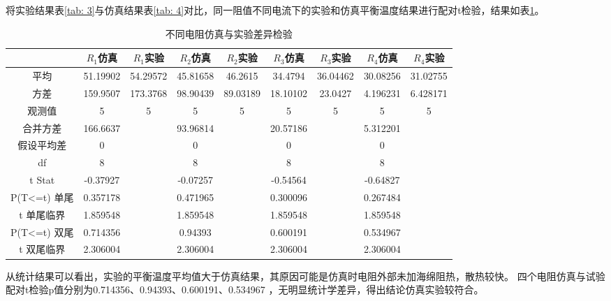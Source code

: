 \documentclass[10pt,a4paper,twoside,UTF8]{ctexart}
\begin{document}
将实验结果表\ref{tab: 3}与仿真结果表\ref{tab: 4}对比，同一阻值不同电流下的实验和仿真平衡温度结果进行配对t检验，结果如表\ref{tab: 5}。
\begin{table}[H]
	\centering
	  \begin{tabular}{ccccccccc}
		\toprule
		& $R_1$仿真 & $R_1$实验 & $R_2$仿真 & $R_2$实验 & $R_3$仿真 & $R_3$实验 & $R_4$仿真 & $R_4$实验 \\
		\midrule
		平均    & 51.19902 & 54.29572 & 45.81658 & 46.2615 & 34.4794 & 36.04462 & 30.08256 & 31.02755 \\
		方差    & 159.9507 & 173.3768 & 98.90439 & 89.03189 & 18.10102 & 23.0427 & 4.196231 & 6.428171 \\
		观测值   & 5     & 5     & 5     & 5     & 5     & 5     & 5     & 5 \\
		合并方差  & 166.6637 &       & 93.96814 &       & 20.57186 &       & 5.312201 &  \\
		假设平均差 & 0     &       & 0     &       & 0     &       & 0     &  \\
		df    & 8     &       & 8     &       & 8     &       & 8     &  \\
		t Stat & -0.37927 &       & -0.07257 &       & -0.54564 &       & -0.64827 &  \\
		P(T<=t) 单尾 & 0.357178 &       & 0.471965 &       & 0.300096 &       & 0.267484 &  \\
		t 单尾临界 & 1.859548 &       & 1.859548 &       & 1.859548 &       & 1.859548 &  \\
		P(T<=t) 双尾 & 0.714356 &       & 0.94393 &       & 0.600191 &       & 0.534967 &  \\
		t 双尾临界 & 2.306004 &       & 2.306004 &       & 2.306004 &       & 2.306004 &  \\
		\bottomrule	\end{tabular}
	\caption{不同电阻仿真与实验差异检验}	  
	\label{tab: 5}
  \end{table}

  从统计结果可以看出，实验的平衡温度平均值大于仿真结果，其原因可能是仿真时电阻外部未加海绵阻热，散热较快。
  四个电阻仿真与试验配对t检验p值分别为0.714356、0.94393、0.600191、0.534967 ，无明显统计学差异，得出结论仿真实验较符合。
\end{document}
